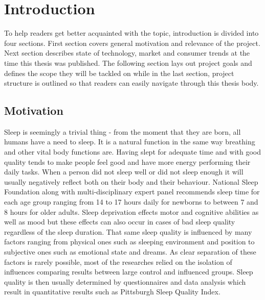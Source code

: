 \chapter{Introduction}

To help readers get better acquainted with the topic, introduction is divided into four sections. First section covers general motivation and relevance of the project. Next section describes state of technology, market and consumer trends at the time this thesis was published. The following section lays out project goals and defines the scope they will be tackled on while in the last section, project structure is outlined so that readers can easily navigate through this thesis body.


\section{Motivation}

Sleep is seemingly a trivial thing - from the moment that they are born, all humans have a need to sleep. It is a natural function in the same way breathing and other vital body functions are. Having slept for adequate time and with good quality tends to make people feel good and have more energy performing their daily tasks. When a person did not sleep well or did not sleep enough it will usually negatively reflect both on their body and their behaviour. National Sleep Foundation along with multi-disciplinary expert panel recommends sleep time for each age group ranging from 14 to 17 hours daily for newborns to between 7 and 8 hours for older adults\cite{NSF}. Sleep deprivation effects motor and cognitive abilities as well as mood but these effects can also occur in cases of bad sleep quality regardless of the sleep duration\cite{doi:10.1093/sleep/19.4.318}. That same sleep quality is influenced by many factors ranging from physical ones such as sleeping environment and position to subjective ones such as emotional state and dreams. As clear separation of these factors is rarely possible, most of the researches relied on the isolation of influences comparing results between large control and influenced groups. Sleep quality is then usually determined by questionnaires and data analysis which result in quantitative results such as Pittsburgh Sleep Quality Index\cite{psqi}.\\

